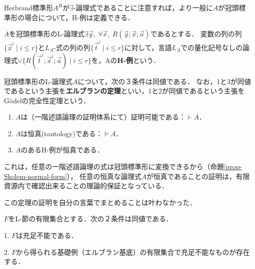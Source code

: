 \documentclass[uplatex, 12pt, dvipdfmx]{jsreport}
\begin{document}
Herbrand標準形$A^H$が$\exists$-論理式であることに注意すれば，より一般に$A$が冠頭標準形の場合について，H-例は定義できる．

\begin{definition}
    $A$を冠頭標準形のL-論理式$\exists\vec{y},\;\forall\vec{x},\;R(\vec{y};\vec{x};\vec{a})$であるとする．
    変数の列の列$\{\vec{x}^i\mid i\le r\}$と$L_A$-式の列の列$\{\vec{t}^i\mid i\le r\}$に対して，言語$L_A$での量化記号なしの論理式$\lor\{R(\vec{t}^i;\vec{x}^i;\vec{a})\mid i\le r\}$を，Aの\textbf{H-例}という．
\end{definition}

\begin{theorem}\label{thm-Herbrand}
    冠頭標準形のL-論理式$A$について，次の３条件は同値である．
    なお，1と3が同値であるという主張を\textbf{エルブランの定理}といい，1と2が同値であるという主張をGödelの完全性定理という．
    \begin{enumerate}
        \item $A$は（一階述語論理の証明体系にて）証明可能である：$\vdash A$．
        \item $A$は恒真(tautology)である：$\vDash A$．
        \item $A$のあるH-例が恒真である．
    \end{enumerate}
\end{theorem}
\begin{remark}
    これは，任意の一階述語論理の式は冠頭標準形に変換できるから（命題\ref{prop-Skolem-normal-form}），
    任意の恒真な論理式$A$が恒真であることの証明は，有限資源内で確認出来ることの理論的保証となっている．
\end{remark}
この定理の証明を自分の言葉でまとめることは叶わなかった．

\begin{theorem}
    $F$をL-節の有限集合とする．次の２条件は同値である．

    1. $F$は充足不能である．

    2. $F$から得られる基礎例（エルブラン基底）の有限集合で充足不能なものが存在する．
\end{theorem}
\end{document}
